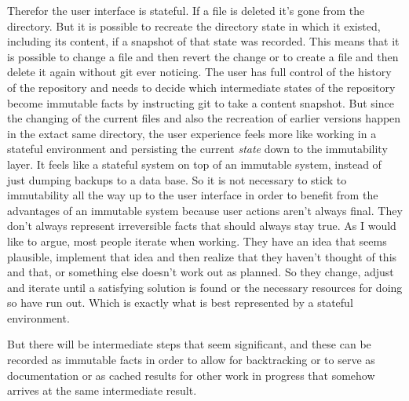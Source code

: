 Therefor the user interface is stateful. If a file is deleted
it's gone from the directory. But it is possible to recreate
the directory state in which it existed, including its content,
if a snapshot of that state was recorded. This means that it is
possible to change a file and then revert the change or to
create a file and then delete it again without git
ever noticing. The user has full control of the
history of the repository and needs to decide which intermediate
states of the repository become immutable facts by instructing
git to take a content snapshot. But since the changing of the
current files and also the recreation of earlier versions happen in
the extact same directory, the user experience feels more like working
in a stateful environment and persisting the current \textit{state}
down to the immutability layer. It feels like a stateful system
on top of an immutable system, instead of just dumping backups to
a data base.
\newline
So it is not necessary to stick to immutability all the way up
to the user interface in order to benefit from the advantages
of an immutable system because user actions aren't always final.
They don't always represent irreversible facts that should always
stay true. As I would like to argue, most people iterate when
working. They have an idea that seems plausible, implement that
idea and then realize that they haven't thought of this and that,
or something else doesn't work out as planned. So they change,
adjust and iterate until a satisfying solution is found or the
necessary resources for doing so have run out. Which is exactly
what is best represented by a stateful environment.

But there will be intermediate steps that seem significant, and
these can be recorded as immutable facts in order to allow for backtracking
or to serve as documentation or as cached results for other work in progress
that somehow arrives at the same intermediate result.



